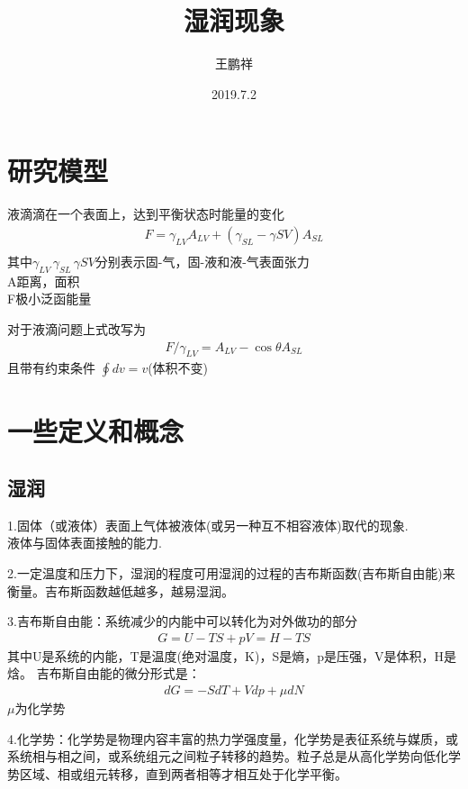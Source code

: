 \documentclass{article}
\begin{document}
\title{湿润现象}
\author{王鹏祥}
\date{2019.7.2}
\maketitle

		\section{研究模型}\setlength{\parindent}{2em}
		液滴滴在一个表面上，达到平衡状态时能量的变化
		\begin{align}
		F=\gamma_{LV}A_{LV}+(\gamma_{SL}-\gamma{SV})A_{SL}\\
		\end{align}
		其中$\gamma_{LV}\,\gamma_{SL}\,\gamma{SV}$分别表示固-气，固-液和液-气表面张力\\
		A距离，面积\\
		F极小泛函能量
		
	   对于液滴问题上式改写为
	   \begin{align}
	   F/\gamma_{LV}=A_{LV}-\cos\theta A_{SL}
	   \end{align}
	   且带有约束条件
	   $\oint dv=v$(体积不变)
		\section{一些定义和概念}
		\subsection{湿润}
		1.固体（或液体）表面上气体被液体(或另一种互不相容液体)取代的现象.\\ 
		  液体与固体表面接触的能力.
		  
		2.一定温度和压力下，湿润的程度可用湿润的过程的吉布斯函数(吉布斯自由能)来衡量。吉布斯函数越低越多，越易湿润。
		
		3.吉布斯自由能：系统减少的内能中可以转化为对外做功的部分\\
		\begin{align}
		G = U - TS + pV = H - TS
		\end{align}
		其中U是系统的内能，T是温度(绝对温度，K)，S是熵，p是压强，V是体积，H是焓。
		吉布斯自由能的微分形式是：
		\begin{align}
     	dG = - SdT + Vdp + \mu dN
		\end{align}
		$\mu$为化学势
		
		4.化学势：化学势是物理内容丰富的热力学强度量，化学势是表征系统与媒质，或系统相与相之间，或系统组元之间粒子转移的趋势。粒子总是从高化学势向低化学势区域、相或组元转移，直到两者相等才相互处于化学平衡。
\end{document}
